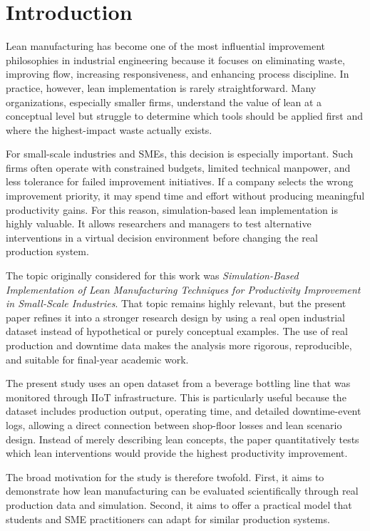 \documentclass[12pt,a4paper]{article}
\begin{document}
\newpage
\section{Introduction}
Lean manufacturing has become one of the most influential improvement philosophies in industrial engineering because it focuses on eliminating waste, improving flow, increasing responsiveness, and enhancing process discipline. In practice, however, lean implementation is rarely straightforward. Many organizations, especially smaller firms, understand the value of lean at a conceptual level but struggle to determine which tools should be applied first and where the highest-impact waste actually exists.

For small-scale industries and SMEs, this decision is especially important. Such firms often operate with constrained budgets, limited technical manpower, and less tolerance for failed improvement initiatives. If a company selects the wrong improvement priority, it may spend time and effort without producing meaningful productivity gains. For this reason, simulation-based lean implementation is highly valuable. It allows researchers and managers to test alternative interventions in a virtual decision environment before changing the real production system.

The topic originally considered for this work was \textit{Simulation-Based Implementation of Lean Manufacturing Techniques for Productivity Improvement in Small-Scale Industries}. That topic remains highly relevant, but the present paper refines it into a stronger research design by using a real open industrial dataset instead of hypothetical or purely conceptual examples. The use of real production and downtime data makes the analysis more rigorous, reproducible, and suitable for final-year academic work.

The present study uses an open dataset from a beverage bottling line that was monitored through IIoT infrastructure. This is particularly useful because the dataset includes production output, operating time, and detailed downtime-event logs, allowing a direct connection between shop-floor losses and lean scenario design. Instead of merely describing lean concepts, the paper quantitatively tests which lean interventions would provide the highest productivity improvement.

The broad motivation for the study is therefore twofold. First, it aims to demonstrate how lean manufacturing can be evaluated scientifically through real production data and simulation. Second, it aims to offer a practical model that students and SME practitioners can adapt for similar production systems.
\end{document}
